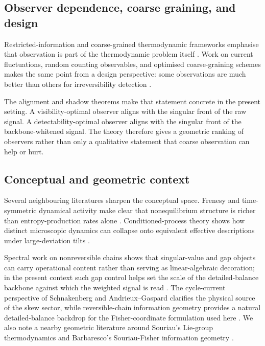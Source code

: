 \documentclass[11pt,a4paper]{article}
\numberwithin{equation}{section}
\theoremstyle{thmcompact}
\theoremstyle{remark}
\begin{document}
\subsection{Observer dependence, coarse graining, and design}

Restricted-information and coarse-grained thermodynamic frameworks emphasise that observation is part of the thermodynamic problem itself \cite{RubinoBruknerManzano2025,PernambucoCeleri2026,vanderMeerSaito2025,TezaStellaGrandPre2025,TezaStella2020}. Work on current fluctuations, random counting observables, and optimised coarse-graining schemes makes the same point from a design perspective: some observations are much better than others for irreversibility detection \cite{GingrichRotskoffHorowitz2017,BaoOhgaIto2025,YuLeightonLynn2025}.

The alignment and shadow theorems make that statement concrete in the present setting. A visibility-optimal observer aligns with the singular front of the raw signal. A detectability-optimal observer aligns with the singular front of the backbone-whitened signal. The theory therefore gives a geometric ranking of observers rather than only a qualitative statement that coarse observation can help or hurt.

\subsection{Conceptual and geometric context}

Several neighbouring literatures sharpen the conceptual space. Frenesy and time-symmetric dynamical activity make clear that nonequilibrium structure is richer than entropy-production rates alone \cite{Maes2020}. Conditioned-process theory shows how distinct microscopic dynamics can collapse onto equivalent effective descriptions under large-deviation tilts \cite{ChetriteTouchette2015}.

Spectral work on nonreversible chains shows that singular-value and gap objects can carry operational content rather than serving as linear-algebraic decoration; in the present context such gap control helps set the scale of the detailed-balance backbone against which the weighted signal is read \cite{Chatterjee2025}. The cycle-current perspective of Schnakenberg and Andrieux--Gaspard clarifies the physical source of the skew sector, while reversible-chain information geometry provides a natural detailed-balance backdrop for the Fisher-coordinate formulation used here \cite{Schnakenberg1976,AndrieuxGaspard2007,WolferWatanabe2021}. We also note a nearby geometric literature around Souriau's Lie-group thermodynamics and Barbaresco's Souriau-Fisher information geometry \cite{Souriau1997,Barbaresco2016,Barbaresco2018}.
\end{document}
